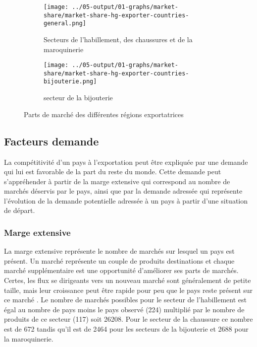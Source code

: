 \documentclass[french,10pt,a4paper]{article}
\begin{document}
\begin{figure}[!h]
  \centering
  \begin{subfigure}{\textwidth}
    \centering    
    \texttt{[image: ../05-output/01-graphs/market-share/market-share-hg-exporter-countries-general.png]}
    \caption{Secteurs de l'habillement, des chaussures et de la maroquinerie}
    \label{fig:market-share-hg-exporter-countries-general}
  \end{subfigure}
  \vspace{0.5cm}
  \begin{subfigure}{\textwidth}
    \centering \texttt{[image: ../05-output/01-graphs/market-share/market-share-hg-exporter-countries-bijouterie.png]}
 \caption{secteur de la bijouterie}
 \label{fig:market-share-hg-exporter-countries-bijouterie}
  \end{subfigure}
  \caption{Parts de marché des différentes régions exportatrices}
  \label{fig:market-share}
\end{figure}


\subsection{Facteurs demande}

La compétitivité d'un pays à l'exportation peut être expliquée par une demande qui lui est favorable de la part du reste du monde. Cette demande peut s'appréhender à partir de la marge extensive qui correspond au nombre de marchés déservis par le pays, ainsi que par la demande adressée qui représente l'évolution de la demande potentielle adressée à un pays à partir d'une situation de départ.

\subsubsection{Marge extensive}


La marge extensive représente le nombre de marchés sur lesquel un pays est présent. Un marché représente un couple de produits destinations et chaque marché supplémentaire est une opportunité d'améliorer ses parts de marchés. Certes, les flux se dirigeants vers un nouveau marché sont généralement de petite taille, mais leur croissance peut être rapide pour peu que le pays reste présent sur ce marché \cite{Bas2015}. Le nombre de marchés possibles pour le secteur de l'habillement est égal au nombre de pays moins le pays observé (224) multiplié par le nombre de produits de ce secteur (117) soit 26208. Pour le secteur de la chaussure ce nombre est de 672 tandis qu'il est de 2464 pour les secteurs de la bijouterie et 2688 pour la maroquinerie.
\end{document}
